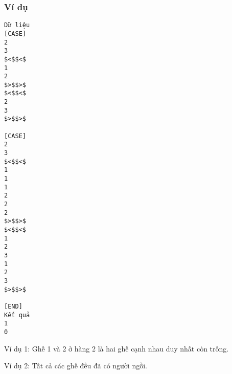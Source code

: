 \subsubsection{   Ví dụ  }
\begin{verbatim}
Dữ liệu
[CASE]
2
3
$<$$<$
1
2
$>$$>$
$<$$<$
2
3
$>$$>$

[CASE]
2
3
$<$$<$
1
1
1
2
2
2
$>$$>$
$<$$<$
1
2
3
1
2
3
$>$$>$

[END]
Kết quả
1
0
\end{verbatim}

   Ví dụ 1: Ghế 1 và 2 ở hàng 2 là hai ghế cạnh nhau duy nhất còn trống.  

   Ví dụ 2: Tất cả các ghế đều đã có người ngồi.  